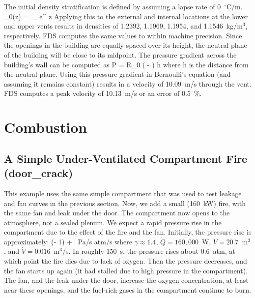 \documentclass[11pt]{book}
\begin{document}
The initial density stratification is defined by assuming a lapse rate of 0~$^\circ$C/m.
\be
   \rho_0(z) = \rho_\infty \, e^{  z}
\ee
Applying this to the external and internal locations at the lower and upper vents results in densities of 1.2392,
1.1969, 1.1954, and 1.1546~kg/m$^3$, respectively.  FDS computes the same values to within machine precision.  Since the
openings in the building are equally spaced over its height, the neutral plane of the building will be close to its midpoint.
The pressure gradient across the building's wall can be computed as
\be
   \delta P =  {R_{0}} \left(  -  \right) h
\ee
where h is the distance from the neutral plane.  Using this pressure gradient in Bernoulli's equation (and assuming it remains constant)
results in a velocity of 10.09~m/s through the vent.  FDS computes a peak velocity of 10.13~m/s or an error of 0.5~\%.

\clearpage






\section{Combustion}


\subsection{A Simple Under-Ventilated Compartment Fire ({\bf door\_crack}) }

This example uses the same simple compartment that was used to test leakage and fan curves in the previous section. Now, we add a small (160~kW) fire, with the same
fan and leak under the door. The compartment now opens to the atmosphere, not a sealed plenum. We expect a rapid pressure rise in the compartment due to the effect of the
fire and the fan. Initially, the pressure rise is approximately:
\be {} \approx (\gamma - 1) \;  + \gamma \,  \;   \; \hbox{Pa/s}   \; \hbox{atm/s}   \ee
where $\gamma \approx 1.4$, $\dot{Q}=160,000$~W, $V=20.7$~m$^3$, and $\dot{V}=0.016$~m$^3$/s. In roughly 150~s, the pressure rises about 0.6~atm, at which point the fire
dies due to lack of oxygen. Then the pressure decreases, and the fan starts up again (it had stalled due to high pressure in the compartment). The fan, and the leak under the
door, increase the oxygen concentration, at least near these openings, and the fuel-rich gases in the compartment continue to burn.
\end{document}
